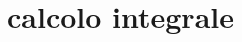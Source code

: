 \chapter{calcolo integrale}

\begin{comment}

\section{misura di Peano-Jordan}

In questo capitolo vogliamo dare una definizione di \emph{misura} di un
sottoinsieme $A\subset \RR^n$ formalizzando le stesse nozioni che sostanzialmente
venivano già usate dagli antichi greci.
Lo faremo nel caso per noi più rilevante ovvero il caso planare $n=2$ in cui la \emph{misura}
di un insieme si chiama \emph{area}.
Ma l'intera costruzione potrebbe essere fatta senza
nessuna difficoltà (se non per le notazioni che si complicano) nel caso generale della
dimensione $n$.

Dato un insieme $A\subset \RR^2$ vorremmo definire la sua area $m(A)\in \RR$
in modo che valgano le seguenti proprietà:
\begin{enumerate}
  \item se $A\cap B=\emptyset$ allora $m(A\cup B) = m(A) + m(B)$ (additività);
  \item se $A \subset B$ allora $m(A) \le m(B)$ (monotonia);
  \item se $A=[a_1,b_1]\times [a_2,b_2]$ (con $a_1\le b_1$, $a_2\le b_2$)
  allora $m(A) = (b_1-a_1)\cdot (b_2-a_2)$ (normalizzazione).
\end{enumerate}

Andremo a definire la misura $m$ su una famiglia di sottoinsiemi di $\RR^2$ che
chiameremo \emph{misurabili} secondo Peano-Jordan.
Si potrebbe dimostrare che non è possibile definire $m$ su tutti i sottoinsiemi di $\RR^2$
in modo che valgano le proprietà enunciate qui sopra.
Sarebbe però possibile
definire la misura su una classe molto più amplia di insiemi, imponendo inoltre
l'additività non solo su unioni finite ma anche su unioni numerabili
($\sigma$ additività).
Quello che si otterrebbe
è la cosiddetta misura di \emph{Lebesgue} che è ormai una costruzione standard
dell'analisi matematica ma ci richiederebbe una teoria molto più complessa da sviluppare.
Ci accontenteremo qui di introdurre la misura $m$ finitamente additiva di Peano-Jordan
che poi ci permetterà di dare significato geometrico all'integrale di Riemann.


\end{comment}
